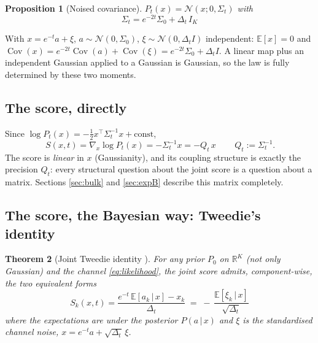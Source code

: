 \documentclass[11pt]{article}
\newtheorem{proposition}{Proposition}
\newtheorem{theorem}[proposition]{Theorem}
\theoremstyle{definition}
\newcommand{\R}{\mathbb{R}}
\newcommand{\N}{\mathcal{N}}
\newcommand{\E}{\mathbb{E}}
\newcommand{\Sig}{\Sigma}
\newcommand{\Dt}{\Delta_t}
\newcommand{\Qt}{Q_t}
\newcommand{\given}{\,|\,}
\newcommand{\T}{^{\!\top}}
\DeclareMathOperator{\Cov}{Cov}
\begin{document}
\begin{proposition}[Noised covariance]\label{prop:Sigt}
$P_t(x)=\N(x;0,\Sig_t)$ with
\begin{equation}\label{eq:Sigt}
  \boxed{\ \Sig_t=e^{-2t}\Sig_0+\Dt\,I_K\ }
\end{equation}
\end{proposition}

\begin{derivation}[\ref*{prop:Sigt}]
With $x=e^{-t}a+\xi$, $a\sim\N(0,\Sig_0)$, $\xi\sim\N(0,\Dt I)$ independent:
$\E[x]=0$ and
$\Cov(x)=e^{-2t}\Cov(a)+\Cov(\xi)=e^{-2t}\Sig_0+\Dt I$. A linear map plus an
independent Gaussian applied to a Gaussian is Gaussian, so the law is fully
determined by these two moments.
\end{derivation}

\subsection{The score, directly}

Since $\log P_t(x)=-\tfrac12x\T\Sig_t^{-1}x+\text{const}$,
\begin{equation}\label{eq:score-matrix}
  \boxed{\,S(x,t)=\nabla_x\log P_t(x)=-\Sig_t^{-1}x=-\Qt\,x\,}\qquad
  \Qt:=\Sig_t^{-1}.
\end{equation}
The score is \emph{linear} in $x$ (Gaussianity), and its coupling structure is
exactly the precision $\Qt$: every structural question about the joint score
is a question about a matrix. Sections \ref{sec:bulk} and \ref{sec:expB}
describe this matrix completely.

\subsection{The score, the Bayesian way: Tweedie's identity}

\begin{theorem}[Joint Tweedie identity \citep{efron2011tweedie,
vincent2011connection,mezard2025generative}]\label{thm:tweedie}
For \emph{any} prior $P_0$ on $\R^K$ (not only Gaussian) and the channel
\eqref{eq:likelihood}, the joint score admits, component-wise, the two
equivalent forms
\begin{equation}\label{eq:tweedie}
  \boxed{\ S_k(x,t)=\frac{e^{-t}\,\E[a_k\given x]-x_k}{\Dt}
   \;=\;-\,\frac{\E[\xi_k\given x]}{\sqrt{\Dt}}\ }
\end{equation}
where the expectations are under the posterior $P(a\given x)$ and $\xi$ is the
standardised channel noise, $x=e^{-t}a+\sqrt{\Dt}\,\xi$.
\end{theorem}
\end{document}
